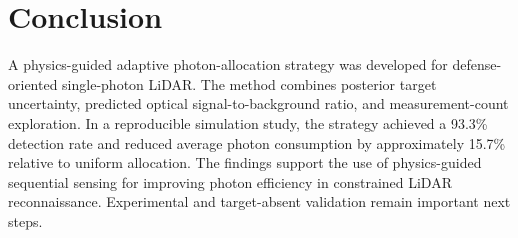 \section{Conclusion}

A physics-guided adaptive photon-allocation strategy was developed for defense-oriented single-photon LiDAR. The method combines posterior target uncertainty, predicted optical signal-to-background ratio, and measurement-count exploration. In a reproducible simulation study, the strategy achieved a 93.3\% detection rate and reduced average photon consumption by approximately 15.7\% relative to uniform allocation. The findings support the use of physics-guided sequential sensing for improving photon efficiency in constrained LiDAR reconnaissance. Experimental and target-absent validation remain important next steps.
